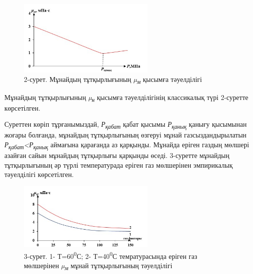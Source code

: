 \begin{figure}[H]
	\centering
	\includegraphics[width=0.6\textwidth]{media/gor/image23.2}
	\caption*{ 2-сурет. Мұнайдың тұтқырлығының \emph{µ\textsubscript{м}}
    қысымға тәуелділігі}
\end{figure}

\begin{multicols}{2}

Мұнайдың тұтқырлығының \emph{µ\textsubscript{н}} қысымға тәуелділігінің
классикалық түрі 2-суретте көрсетілген.

Суреттен көріп тұрғанымыздай, \emph{Р\textsubscript{қабат}} қабат қысымы
\emph{Р\textsubscript{қанық}} қанығу қысымынан жоғары болғанда, мұнайдың
тұтқырлығының өзгеруі мұнай газсыздандырылатын
\emph{Р\textsubscript{қабат}\textless Р\textsubscript{қанық}} аймағына
қарағанда аз қарқынды. Мұнайда еріген газдың мөлшері азайған сайын
мұнайдың тұтқырлығы қарқынды өседі. 3-суретте мұнайдың тұтқырлығының әр
түрлі температурада еріген газ мөлшерінен эмпирикалық тәуелділігі
көрсетілген.
\end{multicols}


\begin{figure}[H]
	\centering
	\includegraphics[width=0.6\textwidth]{media/gor/image23.3}
	\caption*{  3-сурет. 1- Т=60\textsuperscript{0}С; 2-
    Т=40\textsuperscript{0}С темратурасында еріген газ мөлшерінен
    \emph{µ\textsubscript{м}} мұнай тұтқырлығының тәуелділігі}

\end{figure}

